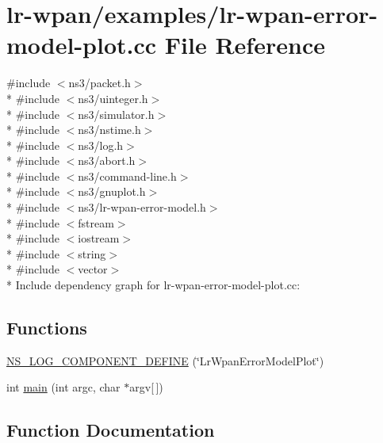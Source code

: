 \hypertarget{lr-wpan-error-model-plot_8cc}{}\section{lr-\/wpan/examples/lr-\/wpan-\/error-\/model-\/plot.cc File Reference}
\label{lr-wpan-error-model-plot_8cc}
{\ttfamily \#include $<$ns3/packet.\+h$>$}\\*
{\ttfamily \#include $<$ns3/uinteger.\+h$>$}\\*
{\ttfamily \#include $<$ns3/simulator.\+h$>$}\\*
{\ttfamily \#include $<$ns3/nstime.\+h$>$}\\*
{\ttfamily \#include $<$ns3/log.\+h$>$}\\*
{\ttfamily \#include $<$ns3/abort.\+h$>$}\\*
{\ttfamily \#include $<$ns3/command-\/line.\+h$>$}\\*
{\ttfamily \#include $<$ns3/gnuplot.\+h$>$}\\*
{\ttfamily \#include $<$ns3/lr-\/wpan-\/error-\/model.\+h$>$}\\*
{\ttfamily \#include $<$fstream$>$}\\*
{\ttfamily \#include $<$iostream$>$}\\*
{\ttfamily \#include $<$string$>$}\\*
{\ttfamily \#include $<$vector$>$}\\*
Include dependency graph for lr-\/wpan-\/error-\/model-\/plot.cc\+:
\subsection*{Functions}
\begin{DoxyCompactItemize}
\item 
\hyperlink{lr-wpan-error-model-plot_8cc_a40c12e7e6774e373228673df2889b2f2}{N\+S\+\_\+\+L\+O\+G\+\_\+\+C\+O\+M\+P\+O\+N\+E\+N\+T\+\_\+\+D\+E\+F\+I\+NE} (\char`\"{}Lr\+Wpan\+Error\+Model\+Plot\char`\"{})
\item 
int \hyperlink{lr-wpan-error-model-plot_8cc_a0ddf1224851353fc92bfbff6f499fa97}{main} (int argc, char $\ast$argv\mbox{[}$\,$\mbox{]})
\end{DoxyCompactItemize}


\subsection{Function Documentation}
